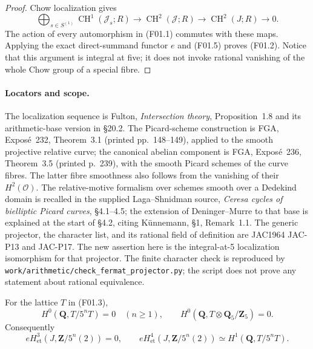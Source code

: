 \begin{proof}
Chow localization gives
\[
 \bigoplus_{s\in S^{(1)}}\operatorname{CH}^1(\mathcal J_s;R)
 \longrightarrow\operatorname{CH}^2(\mathcal J;R)
 \longrightarrow\operatorname{CH}^2(J;R)\longrightarrow0.
 \tag{F01.6}
\]
The action of every automorphism in (F01.1) commutes with these
maps.  Applying the exact direct-summand functor $e$ and (F01.5)
proves (F01.2).  Notice that this argument is integral at five;
it does not invoke rational vanishing of the whole Chow group of
a special fibre.
\end{proof}

\paragraph{Locators and scope.}
The localization sequence is Fulton, \emph{Intersection theory},
Proposition~1.8 and its arithmetic-base version in \S20.2.
The Picard-scheme construction is FGA, Expos\'e~232,
Theorem~3.1 (printed pp.~148--149), applied to the smooth
projective relative curve; the canonical abelian component is
FGA, Expos\'e~236, Theorem~3.5 (printed p.~239), with the smooth
Picard schemes of the curve fibres.  The latter fibre smoothness
also follows from the vanishing of their $H^2(\mathcal O)$.
The relative-motive formalism over schemes smooth over a Dedekind
domain is recalled in the supplied Laga--Shnidman source,
\emph{Ceresa cycles of bielliptic Picard curves}, \S4.1--4.5;
the extension of Deninger--Murre to that base is explained at the
start of \S4.2, citing K\"unnemann, \S1, Remark~1.1.
The generic projector, the character list, and its rational field
of definition are JAC1964 JAC-P13 and JAC-P17.  The new assertion
here is the integral-at-5 localization isomorphism for that
projector.  The finite character check is reproduced by
\texttt{work/arithmetic/check\_fermat\_projector.py}; the script
does not prove any statement about rational equivalence.

\begin{lemma}[C44-F02]\label{C44-F02}
For the lattice $T$ in (F01.3),
\[
 H^0(\mathbf Q,T/5^nT)=0\quad(n\ge1),
 \qquad H^0(\mathbf Q,T\otimes\mathbf Q_5/\mathbf Z_5)=0.
 \tag{F02.1}
\]
Consequently
\[
 eH^3_{\mathrm{et}}(J,\mathbf Z/5^n(2))=0,
 \qquad
 eH^4_{\mathrm{et}}(J,\mathbf Z/5^n(2))
       \simeq H^1(\mathbf Q,T/5^nT).             \tag{F02.2}
\]
\end{lemma}

